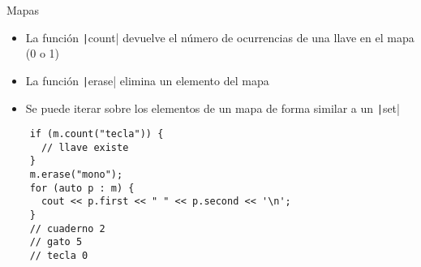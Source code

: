 \documentclass[10pt]{beamer}
\newcommand{\bi}{\begin{itemize}}
\newcommand{\ei}{\end{itemize}}
\begin{document}
\begin{frame}[fragile]{Mapas}
  \bi
    \item La función \texttt|count| devuelve el número de ocurrencias de una llave en el mapa (0 o 1)
    \item La función \texttt|erase| elimina un elemento del mapa
    \item Se puede iterar sobre los elementos de un mapa de forma similar a un \texttt|set|
  \ei
  \begin{verbatim}
    if (m.count("tecla")) {
      // llave existe
    }
    m.erase("mono");
    for (auto p : m) {
      cout << p.first << " " << p.second << '\n';
    }
    // cuaderno 2
    // gato 5
    // tecla 0
  \end{verbatim}
\end{frame}
\end{document}
